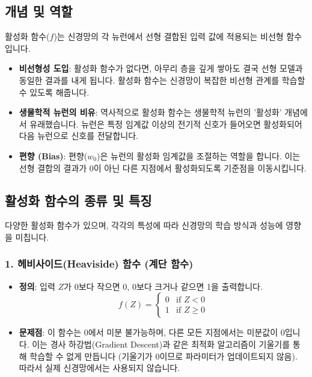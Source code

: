 \documentclass[11pt,a4paper]{article}
\begin{document}
\subsection*{개념 및 역할}
활성화 함수($f$)는 신경망의 각 뉴런에서 선형 결합된 입력 값에 적용되는 비선형 함수입니다.
\begin{itemize}
    \item \textbf{비선형성 도입}: 활성화 함수가 없다면, 아무리 층을 깊게 쌓아도 결국 선형 모델과 동일한 결과를 내게 됩니다. 활성화 함수는 신경망이 복잡한 비선형 관계를 학습할 수 있도록 해줍니다.
    \item \textbf{생물학적 뉴런의 비유}: 역사적으로 활성화 함수는 생물학적 뉴런의 '활성화' 개념에서 유래했습니다. 뉴런은 특정 임계값 이상의 전기적 신호가 들어오면 활성화되어 다음 뉴런으로 신호를 전달합니다.
    \item \textbf{편향 (Bias)}: 편향($w_0$)은 뉴런의 활성화 임계값을 조절하는 역할을 합니다. 이는 선형 결합의 결과가 0이 아닌 다른 지점에서 활성화되도록 기준점을 이동시킵니다.
\end{itemize}

\subsection*{활성화 함수의 종류 및 특징}
다양한 활성화 함수가 있으며, 각각의 특성에 따라 신경망의 학습 방식과 성능에 영향을 미칩니다.

\subsubsection*{1. 헤비사이드(Heaviside) 함수 (계단 함수)}
\begin{itemize}
    \item \textbf{정의}: 입력 $Z$가 0보다 작으면 0, 0보다 크거나 같으면 1을 출력합니다.
    \[ f(Z) = \begin{cases} 0 & \text{if } Z < 0 \\ 1 & \text{if } Z \ge 0 \end{cases} \]
    \item \textbf{문제점}: 이 함수는 0에서 미분 불가능하며, 다른 모든 지점에서는 미분값이 0입니다. 이는 경사 하강법(Gradient Descent)과 같은 최적화 알고리즘이 기울기를 통해 학습할 수 없게 만듭니다 (기울기가 0이므로 파라미터가 업데이트되지 않음). 따라서 실제 신경망에서는 사용되지 않습니다.
\end{itemize}
\end{document}
